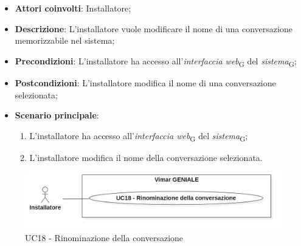 \begin{itemize}
    \item \textbf{Attori coinvolti}: Installatore;
    \item \textbf{Descrizione}: L'installatore vuole modificare il nome di una conversazione memorizzabile nel sistema;
    \item \textbf{Precondizioni}: L’installatore ha accesso all’\textit{interfaccia web}\textsubscript{G} del \textit{sistema}\textsubscript{G};
    \item \textbf{Postcondizioni}: L'installatore modifica il nome di una conversazione selezionata;
    \item \textbf{Scenario principale}:
    \begin{enumerate}
        \item L’installatore ha accesso all’\textit{interfaccia web}\textsubscript{G} del \textit{sistema}\textsubscript{G};
        \item L'installatore modifica il nome della conversazione selezionata.
    \end{enumerate}
\end{itemize}
\begin{figure}[H]
\centering
\includegraphics[width=1\textwidth]{contents/casi_duso/png/UC18.png}
\caption{UC18 - Rinominazione della conversazione}
\end{figure}